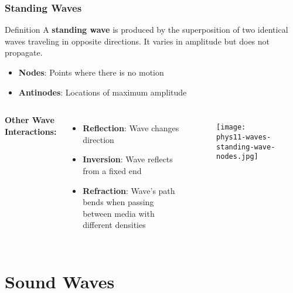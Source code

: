\documentclass{beamer}
\begin{document}
\begin{frame}
\frametitle{Standing Waves}
\begin{block}{Definition}
A \textbf{standing wave} is produced by the superposition of two identical waves traveling in opposite directions. It varies in amplitude but does not propagate.
\end{block}

\begin{itemize}
\item \textbf{Nodes}: Points where there is no motion
\item \textbf{Antinodes}: Locations of maximum amplitude
\end{itemize}

\begin{columns}
\textbf{Other Wave Interactions:}
\begin{itemize}
\item \textbf{Reflection}: Wave changes direction
\item \textbf{Inversion}: Wave reflects from a fixed end
\item \textbf{Refraction}: Wave's path bends when passing between media with different densities
\end{itemize}

\begin{figure}
    \centering
    \texttt{[image: phys11-waves-standing-wave-nodes.jpg]}
\end{figure}
\end{columns}
\end{frame}

\section{Sound Waves}
\end{document}
